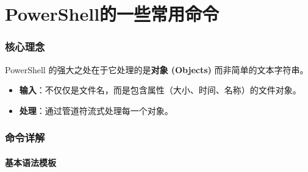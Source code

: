 \documentclass[10pt,CJKmath]{ctexart}
\begin{document}
	

	\part{PowerShell的一些常用命令}
\section{核心理念}
PowerShell 的强大之处在于它处理的是\textbf{对象 (Objects)} 而非简单的文本字符串。
\begin{itemize}
	\item \textbf{输入}：不仅仅是文件名，而是包含属性（大小、时间、名称）的文件对象。
	\item \textbf{处理}：通过管道符流式处理每一个对象。
\end{itemize}

\section{命令详解}

\subsection{基本语法模板}
\end{document}
